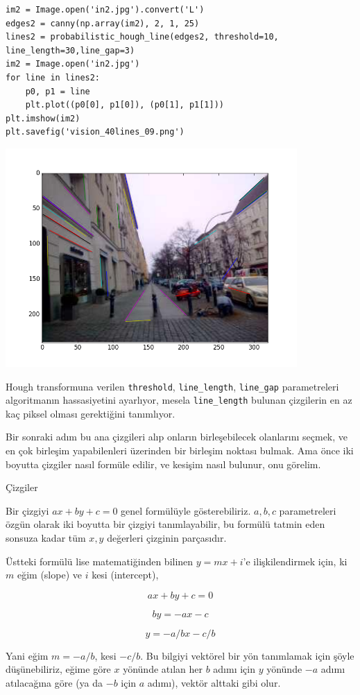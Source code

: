 \documentclass[12pt,fleqn]{article}\usepackage{../../common}
\begin{document}
\begin{verbatim}
im2 = Image.open('in2.jpg').convert('L')
edges2 = canny(np.array(im2), 2, 1, 25)
lines2 = probabilistic_hough_line(edges2, threshold=10, line_length=30,line_gap=3)
im2 = Image.open('in2.jpg')
for line in lines2:
    p0, p1 = line
    plt.plot((p0[0], p1[0]), (p0[1], p1[1]))
plt.imshow(im2)
plt.savefig('vision_40lines_09.png')
\end{verbatim}

\includegraphics[width=30em]{vision_40lines_09.png}

Hough transformuna verilen \verb!threshold!, \verb!line_length!,
\verb!line_gap! parametreleri algoritmanın hassasiyetini ayarlıyor, mesela
\verb!line_length! bulunan çizgilerin en az kaç piksel olması gerektiğini
tanımlıyor.

Bir sonraki adım bu ana çizgileri alıp onların birleşebilecek olanlarını
seçmek, ve en çok birleşim yapabilenleri üzerinden bir birleşim noktası
bulmak. Ama önce iki boyutta çizgiler nasıl formüle edilir, ve kesişim
nasıl bulunur, onu görelim.

Çizgiler

Bir çizgiyi $ax+by+c = 0$ genel formülüyle gösterebiliriz. $a,b,c$
parametreleri özgün olarak iki boyutta bir çizgiyi tanımlayabilir, bu
formülü tatmin eden sonsuza kadar tüm $x,y$ değerleri çizginin
parçasıdır. 

Üstteki formülü lise matematiğinden bilinen $y=mx+i$'e ilişkilendirmek
için, ki $m$ eğim (slope) ve $i$ kesi (intercept),

$$ ax+by+c = 0 $$

$$ by = -ax -c$$

$$ y = -a/b x -c/b$$

Yani eğim $m=-a/b$, kesi $-c/b$. Bu bilgiyi vektörel bir yön tanımlamak
için şöyle düşünebiliriz, eğime göre $x$ yönünde atılan her $b$ adımı için
$y$ yönünde $-a$ adımı atılacağına göre (ya da $-b$ için $a$ adımı), vektör
alttaki gibi olur.
\end{document}
